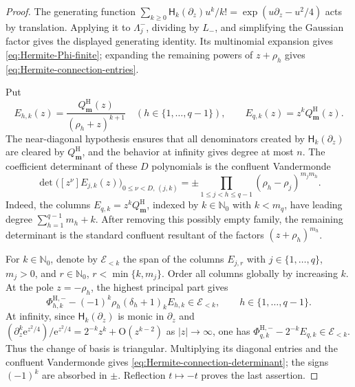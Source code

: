 \documentclass[10pt]{amsart}
\newcommand{\Nzero}{\mathbb N_0}
\newcommand{\e}{\mathrm e}
\newcommand{\mm}{\boldsymbol m}
\theoremstyle{plain}
\theoremstyle{definition}
\theoremstyle{remark}
\begin{document}
\begin{proof}
The generating function
\(\sum_{k\ge0}\mathsf H_k(\partial_z)u^k/k!
=\exp(u\partial_z-u^2/4)\) acts by translation. Applying it to
\(\Lambda_j^-\), dividing by \(L_-\), and simplifying the Gaussian
factor gives the displayed generating identity. Its multinomial expansion
gives \eqref{eq:Hermite-Phi-finite}; expanding the remaining powers of
\(z+\rho_h\) gives \eqref{eq:Hermite-connection-entries}.

Put
\[
 E_{h,k}(z)=\frac{Q_{\mm}^{\mathrm H}(z)}
 {(\rho_h+z)^{k+1}}
 \quad(h\in\{1,\ldots,q-1\}),\qquad
 E_{q,k}(z)=z^kQ_{\mm}^{\mathrm H}(z).
\]
The near-diagonal hypothesis ensures that all denominators created by
\(\mathsf H_k(\partial_z)\) are cleared by \(Q_{\mm}^{\mathrm H}\), and the behavior
at infinity gives degree at most \(n\). The coefficient determinant of
these \(D\) polynomials is the confluent Vandermonde
\[
 \det\bigl([z^\nu]E_{j,k}(z)\bigr)_{
 0\le\nu<D,\,(j,k)}
 =\pm\prod_{1\le j<h\le q-1}(\rho_h-\rho_j)^{m_jm_h}.
\]
Indeed, the columns \(E_{q,k}=z^kQ_{\mm}^{\mathrm H}\), indexed by
\(k\in\Nzero\) with \(k<m_q\), have leading degree
\(\sum_{h=1}^{q-1}m_h+k\). After removing this possibly empty family, the
remaining determinant is the standard confluent resultant of the factors
\((z+\rho_h)^{m_h}\).

For \(k\in\Nzero\), denote by \(\mathcal E_{<k}\) the span of the columns
\(E_{j,r}\) with \(j\in\{1,\ldots,q\}\), \(m_j>0\), and \(r\in\Nzero\),
\(r<\min\{k,m_j\}\). Order all columns globally by increasing \(k\). At the pole
\(z=-\rho_h\), the highest principal part gives
\[
 \Phi_{h,k}^{\mathrm H,-}
 -(-1)^k\rho_h(\delta_h+1)_kE_{h,k}
 \in\mathcal E_{<k},\qquad h\in\{1,\ldots,q-1\}.
\]
At infinity, since \(\mathsf H_k(\partial_z)\) is monic in
\(\partial_z\) and
\((\partial_z^k\e^{z^2/4})/\e^{z^2/4}
=2^{-k}z^k+\mathrm O(z^{k-2})\) as \(|z|\to\infty\), one has
\(\Phi_{q,k}^{\mathrm H,-}-2^{-k}E_{q,k}\in\mathcal E_{<k}\).
Thus the change of basis is triangular. Multiplying its diagonal entries
and the confluent Vandermonde gives
\eqref{eq:Hermite-connection-determinant}; the signs \((-1)^k\) are
absorbed in \(\pm\). Reflection \(t\mapsto-t\) proves the last assertion.
\end{proof}
\end{document}
